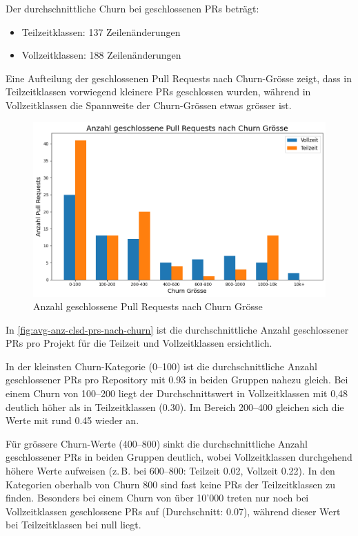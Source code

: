Der durchschnittliche Churn bei geschlossenen PRs beträgt: \begin{itemize} \item Teilzeitklassen: 137 Zeilenänderungen \item Vollzeitklassen: 188 Zeilenänderungen \end{itemize}

Eine Aufteilung der geschlossenen Pull Requests nach Churn-Grösse zeigt, dass in Teilzeitklassen vorwiegend kleinere PRs geschlossen wurden, während in Vollzeitklassen die Spannweite der Churn-Grössen etwas grösser ist.

\begin{figure}[htbp]
    \includegraphics[width=\textwidth]{Figures/anzahl-geschlossene-prs-nach-churn.png}
    \caption{Anzahl geschlossene Pull Requests nach Churn Grösse}
    \label{fig:anz-clsd-prs-nach-churn}
\end{figure}

In \autoref{fig:avg-anz-clsd-prs-nach-churn} ist die durchschnittliche Anzahl geschlossener PRs pro Projekt für die Teilzeit und Vollzeitklassen ersichtlich.

In der kleinsten Churn-Kategorie (0--100) ist die durchschnittliche Anzahl geschlossener PRs pro Repository mit 0.93 in beiden Gruppen nahezu gleich. Bei einem Churn von 100--200 liegt der Durchschnittswert in Vollzeitklassen mit 0{,}48 deutlich höher als in Teilzeitklassen (0.30). Im Bereich 200--400 gleichen sich die Werte mit rund 0.45 wieder an.

Für grössere Churn-Werte (400--800) sinkt die durchschnittliche Anzahl geschlossener PRs in beiden Gruppen deutlich, wobei Vollzeitklassen durchgehend höhere Werte aufweisen (z.\,B. bei 600--800: Teilzeit 0.02, Vollzeit 0.22). In den Kategorien oberhalb von Churn 800 sind fast keine PRs der Teilzeitklassen zu finden. Besonders bei einem Churn von über 10'000 treten nur noch bei Vollzeitklassen geschlossene PRs auf (Durchschnitt: 0.07), während dieser Wert bei Teilzeitklassen bei null liegt.

